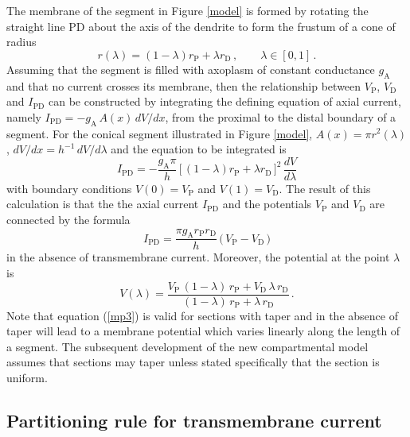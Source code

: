The membrane of the segment in Figure \ref{model} is formed by
rotating the straight line PD about the axis of the dendrite to
form the frustum of a cone of radius
\begin{equation}\label{mp1}
r(\lambda)=(1-\lambda)r_\mathrm{P}+\lambda r_\mathrm{D} \,,\qquad
\lambda\in[0,1]\,.
\end{equation}
Assuming that the segment is filled with axoplasm of constant
conductance $g_\mathrm{A}$ and that no current crosses its
membrane, then the relationship between $V_\mathrm{P}$,
$V_\mathrm{D}$ and $I_\mathrm{PD}$ can be constructed by
integrating the defining equation of axial current, namely
$I_\mathrm{PD}=-g_\mathrm{A}\,A(x)\,dV/dx$, from the proximal to
the distal boundary of a segment. For the conical segment
illustrated in Figure \ref{model}, $A(x)=\pi r^2(\lambda)$,
$dV/dx=h^{-1}\,dV/d\lambda$ and the equation to be integrated is
\[
I_\mathrm{PD}=-\frac{g_\mathrm{A}\pi}{h}\,\Big[\,
(1-\lambda)r_\mathrm{P}+\lambda r_\mathrm{D}\,\Big]^2\,
\frac{dV}{d\lambda}
\]
with boundary conditions $V(0)=V_\mathrm{P}$ and
$V(1)=V_\mathrm{D}$. The result of this calculation is that the
the axial current $I_\mathrm{PD}$ and the potentials
$V_\mathrm{P}$ and $V_\mathrm{D}$ are connected by the formula
\begin{equation}\label{mp2}
I_\mathrm{PD}= \frac{\pi g_\mathrm{A} r_\mathrm{P}
r_\mathrm{D}}{h}\,\big(\,V_\mathrm{P}-V_\mathrm{D}\,\big)
\end{equation}
in the absence of transmembrane current. Moreover, the potential
at the point $\lambda$ is
\begin{equation}\label{mp3}
V(\lambda) = \frac{V_\mathrm{P}\,(1-\lambda)\,
r_\mathrm{P}+V_\mathrm{D}\,\lambda\,r_\mathrm{D}}
{(1-\lambda)\,r_\mathrm{P}+\lambda\,r_\mathrm{D}}\,.
\end{equation}
Note that equation (\ref{mp3}) is valid for sections with taper
and in the absence of taper will lead to a membrane potential
which varies linearly along the length of a segment. The
subsequent development of the new compartmental model assumes that
sections may taper unless stated specifically that the section is
uniform.

\subsection{Partitioning rule for transmembrane current}

